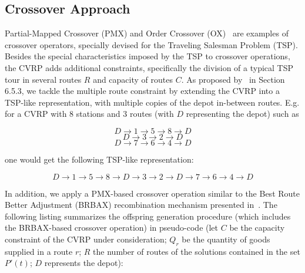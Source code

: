 \subsection{Crossover Approach}
\label{subsec:cross-over}

Partial-Mapped Crossover (PMX) and Order Crossover (OX)~\cite{Toth2002} are 
examples of crossover operators, specially devised for the Traveling Salesman 
Problem (TSP). Besides the special characteristics imposed by the TSP to 
crossover operations, the CVRP adds 
additional constraints, specifically the division of a 
typical TSP tour in several routes $R$ and capacity of routes $C$. As proposed 
by~\cite{Toth2002} in Section 6.5.3, we tackle the multiple route constraint by 
extending the CVRP into a TSP-like representation, with multiple copies of the 
depot in-between routes. E.g. for a CVRP with 8 stations and 3 routes (with 
$D$ representing the depot) such as

\[ D \rightarrow 1 \rightarrow 5 \rightarrow 8 \rightarrow D \] 
\[ D \rightarrow 3 \rightarrow 2 \rightarrow D \] 
\[ D \rightarrow 7 \rightarrow 6 \rightarrow 4 \rightarrow D \] 

one would get the following TSP-like representation:

\[ D \rightarrow 1 \rightarrow 5 \rightarrow 8 \rightarrow D \rightarrow 3 \rightarrow 2 \rightarrow D \rightarrow 7 \rightarrow 6 \rightarrow 4 \rightarrow D \] 

In addition, we apply a PMX-based crossover operation similar to the Best 
Route Better Adjustment (BRBAX) recombination mechanism presented 
in~\cite{Bermudez2010}. The following listing summarizes the offspring 
generation procedure (which includes the BRBAX-based crossover operation) in 
pseudo-code (let $C$ be the capacity constraint of the CVRP under consideration; 
$Q_r$ be the quantity of goods supplied in a route $r$; $R$ the number of 
routes of the solutions contained in the set $P'(t)$; $D$ represents the depot):\vertbreak

